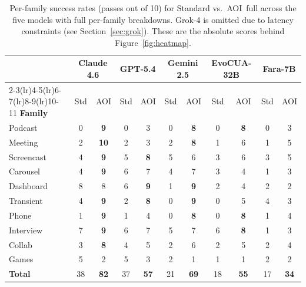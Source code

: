 \documentclass[11pt]{article}
\begin{document}
\begin{table}[!h]
\centering
\caption{Per-family success rates (passes out of 10) for Standard vs.\ AOI~full across the five models
with full per-family breakdowns. Grok-4 is omitted due to latency constraints (see Section~\ref{sec:grok}). These are the absolute scores behind Figure~\ref{fig:heatmap}.}
\label{tab:percategory}
\small
\setlength{\tabcolsep}{2.8pt}
\begin{tabular}{@{}l cc cc cc cc cc@{}}
\toprule
& \multicolumn{2}{c}{\textbf{Claude 4.6}} & \multicolumn{2}{c}{\textbf{GPT-5.4}} & \multicolumn{2}{c}{\textbf{Gemini 2.5}} & \multicolumn{2}{c}{\textbf{EvoCUA-32B}} & \multicolumn{2}{c}{\textbf{Fara-7B}} \\
\cmidrule(lr){2-3}\cmidrule(lr){4-5}\cmidrule(lr){6-7}\cmidrule(lr){8-9}\cmidrule(lr){10-11}
\textbf{Family} & Std & AOI & Std & AOI & Std & AOI & Std & AOI & Std & AOI \\
\midrule
Podcast    & 0 & \textbf{9}  & 0 & 3 & 0 & \textbf{8} & 0 & \textbf{8} & 0 & 3 \\
Meeting    & 2 & \textbf{10} & 2 & 3 & 2 & \textbf{8} & 1 & 6 & 1 & 5 \\
Screencast & 4 & \textbf{9}  & 5 & \textbf{8} & 5 & 6 & 3 & 6 & 3 & 5 \\
Carousel   & 4 & \textbf{9}  & 6 & 7 & 4 & 7 & 3 & 4 & 1 & 3 \\
Dashboard  & 8 & 8           & 6 & \textbf{9} & 1 & \textbf{9} & 2 & 4 & 2 & 2 \\
Transient  & 4 & \textbf{9}  & 2 & \textbf{8} & 0 & \textbf{9} & 0 & 5 & 4 & 3 \\
Phone      & 1 & \textbf{9}  & 1 & 4 & 0 & \textbf{8} & 0 & \textbf{8} & 1 & 4 \\
Interview  & 7 & \textbf{9}  & 6 & 7 & 5 & 7 & 6 & \textbf{8} & 1 & 3 \\
Collab     & 3 & \textbf{8}  & 4 & 5 & 2 & 6 & 2 & 5 & 2 & 4 \\
Games      & 5 & 2           & 5 & 3 & 2 & 1 & 1 & 1 & 2 & 2 \\
\midrule
\textbf{Total} & 38 & \textbf{82} & 37 & \textbf{57} & 21 & \textbf{69} & 18 & \textbf{55} & 17 & \textbf{34} \\
\bottomrule
\end{tabular}
\end{table}
\end{document}
